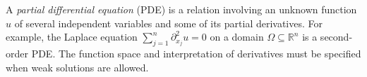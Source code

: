 
A \emph{partial differential equation} (PDE) is a relation involving an unknown function $u$ of several independent variables and some of its partial derivatives. For example, the Laplace equation $\sum_{j=1}^{n}\partial_{x_j}^2u=0$ on a domain $\Omega\subseteq\mathbb R^n$ is a second-order PDE. The function space and interpretation of derivatives must be specified when weak solutions are allowed.
